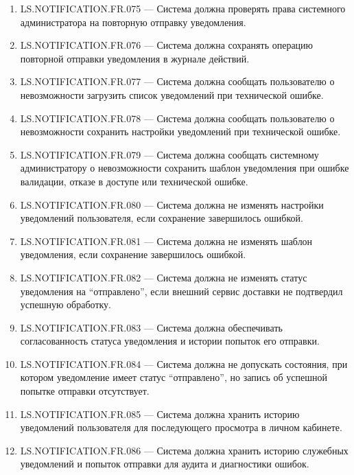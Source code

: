 \documentclass[12pt,a4paper]{article}
\begin{document}
\begin{enumerate}
		\item LS.NOTIFICATION.FR.075 --- Система должна проверять права системного администратора
		на повторную отправку уведомления.
		
		\item LS.NOTIFICATION.FR.076 --- Система должна сохранять операцию повторной отправки
		уведомления в журнале действий.
		
		\item LS.NOTIFICATION.FR.077 --- Система должна сообщать пользователю о невозможности
		загрузить список уведомлений при технической ошибке.
		
		\item LS.NOTIFICATION.FR.078 --- Система должна сообщать пользователю о невозможности
		сохранить настройки уведомлений при технической ошибке.
		
		\item LS.NOTIFICATION.FR.079 --- Система должна сообщать системному администратору
		о невозможности сохранить шаблон уведомления при ошибке валидации, отказе
		в доступе или технической ошибке.
		
		\item LS.NOTIFICATION.FR.080 --- Система должна не изменять настройки уведомлений
		пользователя, если сохранение завершилось ошибкой.
		
		\item LS.NOTIFICATION.FR.081 --- Система должна не изменять шаблон уведомления,
		если сохранение завершилось ошибкой.
		
		\item LS.NOTIFICATION.FR.082 --- Система должна не изменять статус уведомления
		на ``отправлено'', если внешний сервис доставки не подтвердил успешную обработку.
		
		\item LS.NOTIFICATION.FR.083 --- Система должна обеспечивать согласованность статуса
		уведомления и истории попыток его отправки.
		
		\item LS.NOTIFICATION.FR.084 --- Система должна не допускать состояния, при котором
		уведомление имеет статус ``отправлено'', но запись об успешной попытке отправки
		отсутствует.
		
		\item LS.NOTIFICATION.FR.085 --- Система должна хранить историю уведомлений
		пользователя для последующего просмотра в личном кабинете.
		
		\item LS.NOTIFICATION.FR.086 --- Система должна хранить историю служебных уведомлений
		и попыток отправки для аудита и диагностики ошибок.
		

\end{enumerate}
\end{document}
